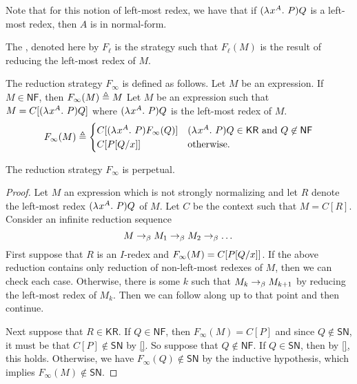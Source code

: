 \documentclass{article}
\begin{document}
Note that for this notion of left-most redex, we have that if $(\lambda^{} x^{A}. \ P)Q$ is a left-most redex, then $A$ is in normal-form.

\begin{definition}
The , denoted here by $F_\ell$ is the strategy such that $F_\ell(M)$ is the result of reducing the left-most redex of $M$.
\end{definition}

\begin{definition}
The reduction strategy $F_\infty$ is defined as follows.
Let $M$ be an expression.
If $M \in \mathsf{NF}$, then $F_\infty(M) \triangleq M$
Let $M$ be an expression such that $M = C[(\lambda^{} x^{A}. \ P)Q]$ where $(\lambda^{} x^{A}. \ P) Q$ is the left-most redex of $M$.
\begin{displaymath}
F_\infty(M) \triangleq
\begin{cases}
  C[(\lambda^{} x^{A}. \ P)F_\infty(Q)] & \text{$(\lambda^{} x^{A}. \ P)Q \in \mathsf{KR}$ and $Q \not \in \mathsf{NF}$} \\
  C[P[Q/x]] & \textnormal{otherwise}. \\
\end{cases}
\end{displaymath}
\end{definition}

\begin{lemma}
The reduction strategy $F_\infty$ is perpetual.
\end{lemma}

\begin{proof}
Let $M$ an expression which is not strongly normalizing and let $R$ denote the left-most redex $(\lambda^{} x^{A}. \ P)Q$ of $M$.
Let $C$ be the context such that $M = C[R]$.
Consider an infinite reduction sequence
\begin{displaymath}
    M \rightarrow_\beta M_1 \rightarrow_\beta M_2 \rightarrow_\beta \dots
\end{displaymath}
First suppose that $R$ is an $I$-redex and $F_\infty(M) = C[P[Q/x]]$.
If the above reduction contains only reduction of non-left-most redexes of $M$, then we can check each case.
Otherwise, there is some $k$ such that $M_k \rightarrow_\beta M_{k + 1}$ by reducing the left-most redex of $M_k$.
Then we can follow along up to that point and then continue.

Next suppose that $R \in \mathsf{KR}$.
If $Q \in \mathsf{NF}$, then $F_\infty(M) = C[P]$ and since $Q \not \in \mathsf{SN}$, it must be that $C[P] \not \in \mathsf{SN}$ by \autoref{}.
So suppose that $Q \not \in \mathsf{NF}$.
If $Q \in \mathsf{SN}$, then by \autoref{}, this holds.
Otherwise, we have $F_\infty(Q) \not \in \mathsf{SN}$ by the inductive hypothesis, which implies $F_\infty(M) \not \in \mathsf{SN}$.
\end{proof}
\end{document}
